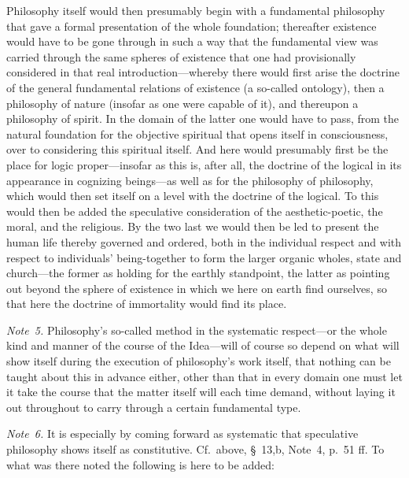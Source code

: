 \documentclass[12pt,a4paper]{book}
\begin{document}
{\small Philosophy itself would then presumably begin with a fundamental philosophy
that gave a formal presentation of the whole foundation; thereafter existence would
have to be gone through in such a way that the fundamental view was carried through
the same spheres of existence that one had provisionally considered in that real
introduction---whereby there would first arise the doctrine of the general
fundamental relations of existence (a so-called ontology), then a philosophy of
nature (insofar as one were capable of it), and thereupon a philosophy of spirit. In
the domain of the latter one would have to pass, from the natural foundation for the
objective spiritual that opens itself in consciousness, over to considering this
spiritual itself. And here would presumably first be the place for logic
proper---insofar as this is, after all, the doctrine of the logical in its appearance
in cognizing beings---as well as for the philosophy of philosophy, which would then
set itself on a level with the doctrine of the logical. To this would then be added
the speculative consideration of the aesthetic-poetic, the moral, and the religious.
By the two last we would then be led to present the human life thereby governed and
ordered, both in the individual respect and with respect to individuals'
being-together to form the larger organic wholes, state and church---the former as
holding for the earthly standpoint, the latter as pointing out beyond the sphere of
existence in which we here on earth find ourselves, so that here the doctrine of
immortality would find its place.\par}

{\small\emph{Note~5.} Philosophy's so-called method in the systematic respect---or the
whole kind and manner of the course of the Idea---will of course so depend on what
will show itself during the execution of philosophy's work itself, that nothing can
be taught about this in advance either, other than that in every domain one must let
it take the course that the matter itself will each time demand, without laying it
out throughout to carry through a certain fundamental type.\par}

{\small\emph{Note~6.} It is especially by coming forward as systematic that
speculative philosophy shows itself as constitutive. Cf.\ above, \S~13,b, Note~4,
p.~51 ff. To what was there noted the following is here to be added:\par}
\end{document}
